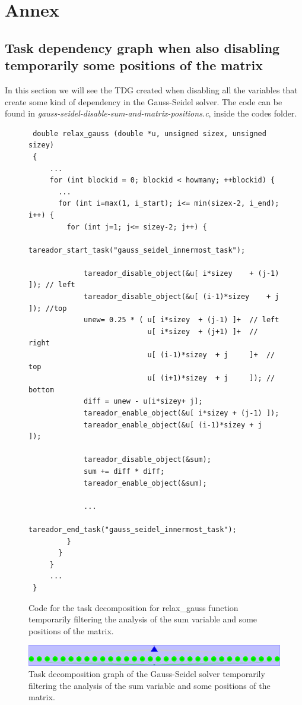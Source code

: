\documentclass[12pt, a4paper]{article}
\begin{document}
\section{Annex}
\subsection{Task dependency graph when also disabling temporarily some positions of the matrix}

In this section we will see the TDG created when disabling all the variables that create some kind of dependency in the Gauss-Seidel solver. The code can be found in \textit{gauss-seidel-disable-sum-and-matrix-positions.c}, inside the codes folder.

\begin{figure}[H]
\begin{lstlisting}
 double relax_gauss (double *u, unsigned sizex, unsigned sizey)
 {
     ...
     for (int blockid = 0; blockid < howmany; ++blockid) {
       ...
       for (int i=max(1, i_start); i<= min(sizex-2, i_end); i++) {
         for (int j=1; j<= sizey-2; j++) {
			 tareador_start_task("gauss_seidel_innermost_task");
 				
			 tareador_disable_object(&u[ i*sizey	+ (j-1) ]); // left
			 tareador_disable_object(&u[ (i-1)*sizey	+ j     ]); //top
			 unew= 0.25 * ( u[ i*sizey	+ (j-1) ]+  // left
 				   			u[ i*sizey	+ (j+1) ]+  // right
				    		u[ (i-1)*sizey	+ j     ]+  // top
				    		u[ (i+1)*sizey	+ j     ]); // bottom
			 diff = unew - u[i*sizey+ j];
			 tareador_enable_object(&u[ i*sizey	+ (j-1) ]);
			 tareador_enable_object(&u[ (i-1)*sizey	+ j     ]);
 			
			 tareador_disable_object(&sum);
			 sum += diff * diff; 
			 tareador_enable_object(&sum);
 			
			 ...
			 tareador_end_task("gauss_seidel_innermost_task");
         }
       }
     }
	 ...
 }
\end{lstlisting}
\caption{Code for the task decomposition for relax\_gauss function temporarily filtering the analysis of the sum variable and some positions of the matrix.}
\end{figure}

\begin{figure}[H]
	\centering
	\includegraphics[scale=0.15]{./images/tareador-gauss-seidel-2b-sum-vector}
	\caption{Task decomposition graph of the Gauss-Seidel solver temporarily filtering the analysis of the sum variable and some positions of the matrix.}
\end{figure}

\label{sec:TDGAllDisablesGaussSeidel}
\end{document}
